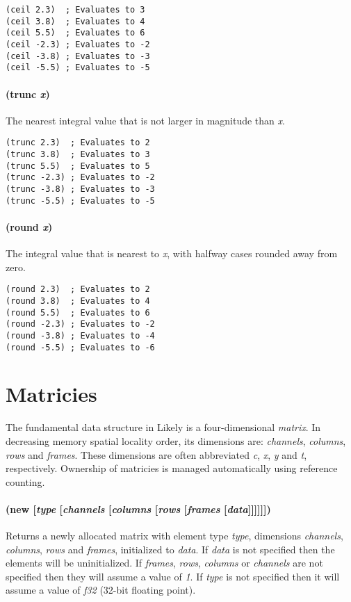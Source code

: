 \documentclass[numbers=noenddot]{scrbook}
\begin{document}
\begin{verbatim}
(ceil 2.3)  ; Evaluates to 3
(ceil 3.8)  ; Evaluates to 4
(ceil 5.5)  ; Evaluates to 6
(ceil -2.3) ; Evaluates to -2
(ceil -3.8) ; Evaluates to -3
(ceil -5.5) ; Evaluates to -5
\end{verbatim}

\paragraph{(trunc \emph{x})}
The nearest integral value that is not larger in magnitude than \emph{x}.

\begin{verbatim}
(trunc 2.3)  ; Evaluates to 2
(trunc 3.8)  ; Evaluates to 3
(trunc 5.5)  ; Evaluates to 5
(trunc -2.3) ; Evaluates to -2
(trunc -3.8) ; Evaluates to -3
(trunc -5.5) ; Evaluates to -5
\end{verbatim}

\paragraph{(round \emph{x})}
The integral value that is nearest to \emph{x}, with halfway cases rounded away from zero.

\begin{verbatim}
(round 2.3)  ; Evaluates to 2
(round 3.8)  ; Evaluates to 4
(round 5.5)  ; Evaluates to 6
(round -2.3) ; Evaluates to -2
(round -3.8) ; Evaluates to -4
(round -5.5) ; Evaluates to -6
\end{verbatim}

\section{Matricies}
The fundamental data structure in Likely is a four-dimensional \emph{matrix}.
In decreasing memory spatial locality order, its dimensions are: \emph{channels}, \emph{columns}, \emph{rows} and \emph{frames}.
These dimensions are often abbreviated \emph{c}, \emph{x}, \emph{y} and \emph{t}, respectively.
Ownership of matricies is managed automatically using reference counting.

\paragraph{(new [\emph{type} [\emph{channels} [\emph{columns} [\emph{rows} [\emph{frames} [\emph{data}]]]]]])}
Returns a newly allocated matrix with element type \emph{type}, dimensions \emph{channels}, \emph{columns}, \emph{rows} and \emph{frames}, initialized to \emph{data}.
If \emph{data} is not specified then the elements will be uninitialized.
If \emph{frames}, \emph{rows}, \emph{columns} or \emph{channels} are not specified then they will assume a value of \emph{1}.
If \emph{type} is not specified then it will assume a value of \emph{f32} (32-bit floating point).
\end{document}
